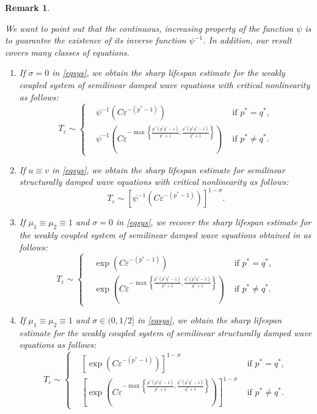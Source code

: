 \documentclass[11pt,reqno]{amsart}
\newcommand{\tron}[1]{\left( #1 \right)}
\numberwithin{equation}{section}
\newtheorem{remark}{Remark}[section]
\newcommand{\e}{\varepsilon}
\theoremstyle{plain}
\begin{document}
\begin{remark} \label{Interesting.Remark}
{\rm
We want to point out that the continuous, increasing property of the function $\psi$ is to guarantee the existence of its inverse function $\psi^{-1}$. In addition, our result covers many classes of equations.
\begin{enumerate}[1.]
    \item If $\sigma=0$ in \eqref{eqsys}, we obtain the sharp lifespan estimate for the weakly coupled system of semilinear damped wave equations with critical nonlinearity as follows:
    $$ T_\e \sim 
    \left\{
    \begin{aligned}
        &\psi^{-1}\tron{C\e^{-(p^*-1)}}&\text{ if }p^*=q^*,\\
        &\psi^{-1}\tron{C\e^{-\max\left\{\frac{p^*(p^*q^*-1)}{p^*+1},\frac{q^*(p^*q^*-1)}{q^*+1}\right\}}}&\text{ if }p^*\neq q^*.
    \end{aligned}
    \right.
    $$
    \item If $u\equiv v$ in \eqref{eqsys}, we obtain the sharp lifespan estimate for semilinear structurally damped wave equations with critical nonlinearity as follows:
    $$ 
    T_\e \sim \left[\psi^{-1}\tron{C\e^{-(p^*-1)}}\right]^{1-\sigma}.
    $$
    \item If $\mu_1\equiv\mu_2\equiv 1$ and $\sigma=0$ in \eqref{eqsys}, we recover the sharp lifespan estimate for the weakly coupled system of semilinear damped wave equations obtained in \cite{ChenAnh2021} as follows:
    $$ T_\e \sim 
    \left\{
    \begin{aligned}
        &\exp\tron{C\e^{-(p^*-1)}}&\text{ if }p^*=q^*,\\
        &\exp\tron{C\e^{-\max\left\{\frac{p^*(p^*q^*-1)}{p^*+1},\frac{q^*(p^*q^*-1)}{q^*+1}\right\}}}&\text{ if }p^*\neq q^*.
    \end{aligned}
    \right.
    $$
    \item If $\mu_1\equiv \mu_2\equiv 1$ and $\sigma\in (0,1/2]$ in \eqref{eqsys}, we obtain the sharp lifespan estimate for the weakly coupled system of semilinear structurally damped wave equations as follows:
    $$ T_\e \sim 
    \left\{
    \begin{aligned}
        &\left[\exp\tron{C\e^{-(p^*-1)}}\right]^{1-\sigma}&\text{ if }p^*=q^*,\\
        &\left[\exp\tron{C\e^{-\max\left\{\frac{p^*(p^*q^*-1)}{p^*+1},\frac{q^*(p^*q^*-1)}{q^*+1}\right\}}}\right]^{1-\sigma} &\text{ if }p^*\neq q^*.
    \end{aligned}
    \right.
    $$
\end{enumerate}

}    
\end{remark}
\end{document}
